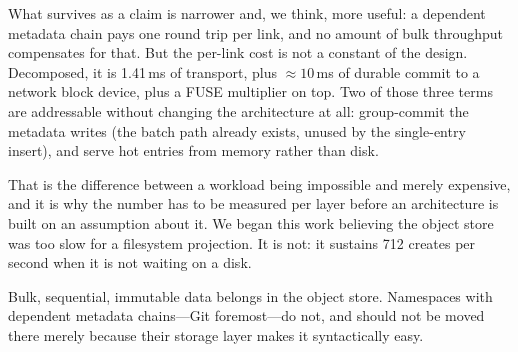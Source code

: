 \documentclass[11pt]{article}
\begin{document}
What survives as a claim is narrower and, we think, more useful: a dependent
metadata chain pays one round trip per link, and no amount of bulk throughput
compensates for that. But the per-link cost is not a constant of the design.
Decomposed, it is 1.41\,ms of transport, plus \(\approx 10\,\)ms of durable
commit to a network block device, plus a FUSE multiplier on top. Two of those
three terms are addressable without changing the architecture at all:
group-commit the metadata writes (the batch path already exists, unused by the
single-entry insert), and serve hot entries from memory rather than disk.

That is the difference between a workload being impossible and merely
expensive, and it is why the number has to be measured per layer before an
architecture is built on an assumption about it. We began this work believing
the object store was too slow for a filesystem projection. It is not: it
sustains 712 creates per second when it is not waiting on a disk.

Bulk, sequential, immutable data belongs in the object store. Namespaces with
dependent metadata chains---Git foremost---do not, and should not be moved
there merely because their storage layer makes it syntactically easy.
\end{document}
